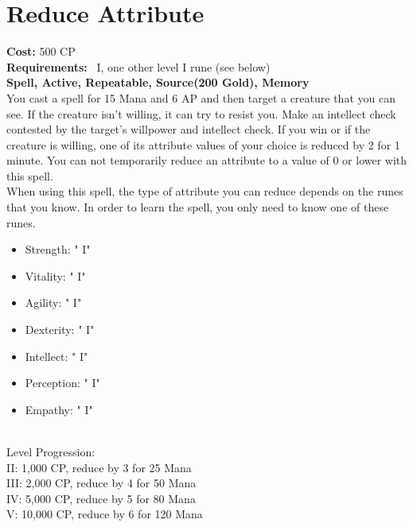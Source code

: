\section{Reduce Attribute}\label{spell:reduceAbility}
\textbf{Cost:} 500 CP\\
\textbf{Requirements:}~ I, one other level I rune (see below)\\
\textbf{Spell, Active, Repeatable, Source(200 Gold), Memory}\\
You cast a spell for 15 Mana and 6 AP and then target a creature that you can see.
If the creature isn't willing, it can try to resist you.
Make an intellect check contested by the target's willpower and intellect check.
If you win or if the creature is willing, one of its attribute values of your choice is reduced by 2 for 1 minute.
You can not temporarily reduce an attribute to a value of 0 or lower with this spell. \\
When using this spell, the type of attribute you can reduce depends on the runes that you know.
In order to learn the spell, you only need to know one of these runes.\\
\begin{itemize}
    \item Strength: " I"
    \item Vitality: " I"
    \item Agility: " I"
    \item Dexterity: " I"
    \item Intellect: " I"
    \item Perception: " I"
    \item Empathy: " I"
\end{itemize}
\\
Level Progression:\\
II: 1,000 CP, reduce by 3 for 25 Mana\\
III: 2,000 CP, reduce by 4 for 50 Mana\\
IV: 5,000 CP, reduce by 5 for 80 Mana\\
V: 10,000 CP, reduce by 6 for 120 Mana\\